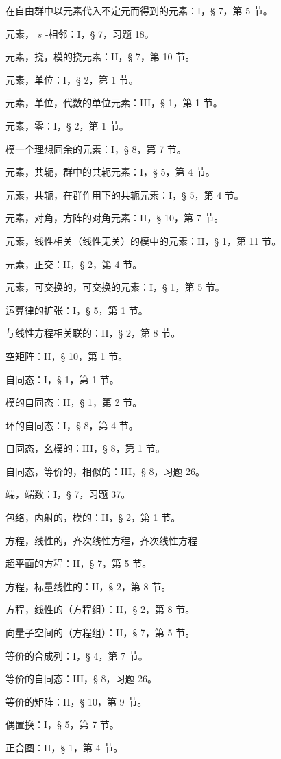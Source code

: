 在自由群中以元素代入不定元而得到的元素：I，§ 7，第 5 节。

元素， \(s\) -相邻：I，§ 7，习题 18。

元素，挠，模的挠元素：II，§ 7，第 10 节。

元素，单位：I，§ 2，第 1 节。

元素，单位，代数的单位元素：III，§ 1，第 1 节。

元素，零：I，§ 2，第 1 节。

模一个理想同余的元素：I，§ 8，第 7 节。

元素，共轭，群中的共轭元素：I，§ 5，第 4 节。

元素，共轭，在群作用下的共轭元素：I，§ 5，第 4 节。

元素，对角，方阵的对角元素：II，§ 10，第 7 节。

元素，线性相关（线性无关）的模中的元素：II，§ 1，第 11 节。

元素，正交：II，§ 2，第 4 节。

元素，可交换的，可交换的元素：I，§ 1，第 5 节。

运算律的扩张：I，§ 5，第 1 节。

与线性方程相关联的：II，§ 2，第 8 节。

空矩阵：II，§ 10，第 1 节。

自同态：I，§ 1，第 1 节。

模的自同态：II，§ 1，第 2 节。

环的自同态：I，§ 8，第 4 节。

自同态，幺模的：III，§ 8，第 1 节。

自同态，等价的，相似的：III，§ 8，习题 26。

端，端数：I，§ 7，习题 37。

包络，内射的，模的：II，§ 2，第 1 节。

方程，线性的，齐次线性方程，齐次线性方程

超平面的方程：II，§ 7，第 5 节。

方程，标量线性的：II，§ 2，第 8 节。

方程，线性的（方程组）：II，§ 2，第 8 节。

向量子空间的（方程组）：II，§ 7，第 5 节。

等价的合成列：I，§ 4，第 7 节。

等价的自同态：III，§ 8，习题 26。

等价的矩阵：II，§ 10，第 9 节。

偶置换：I，§ 5，第 7 节。

正合图：II，§ 1，第 4 节。

